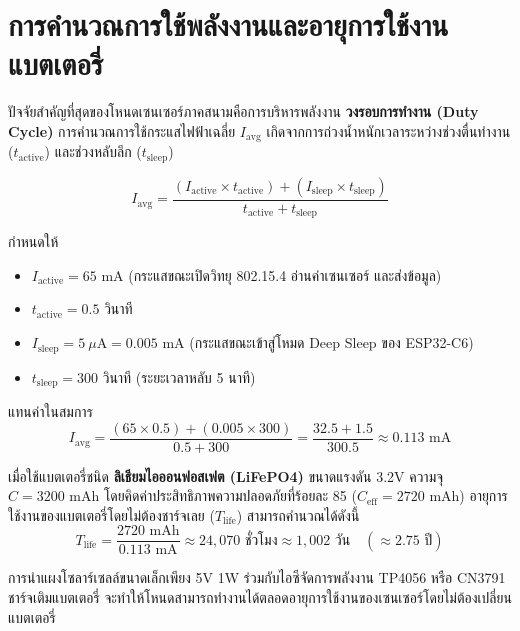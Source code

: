 \section{การคำนวณการใช้พลังงานและอายุการใช้งานแบตเตอรี่}

ปัจจัยสำคัญที่สุดของโหนดเซนเซอร์ภาคสนามคือการบริหารพลังงาน \textbf{วงรอบการทำงาน (Duty Cycle)} การคำนวณการใช้กระแสไฟฟ้าเฉลี่ย $I_{\text{avg}}$ เกิดจากการถ่วงน้ำหนักเวลาระหว่างช่วงตื่นทำงาน ($t_{\text{active}}$) และช่วงหลับลึก ($t_{\text{sleep}}$)

\begin{equation}
    I_{\text{avg}} = \frac{(I_{\text{active}} \times t_{\text{active}}) + (I_{\text{sleep}} \times t_{\text{sleep}})}{t_{\text{active}} + t_{\text{sleep}}}
\end{equation}

กำหนดให้
\begin{itemize}
    \item $I_{\text{active}} = 65\text{ mA}$ (กระแสขณะเปิดวิทยุ 802.15.4 อ่านค่าเซนเซอร์ และส่งข้อมูล)
    \item $t_{\text{active}} = 0.5\text{ วินาที}$
    \item $I_{\text{sleep}} = 5\ \mu\text{A} = 0.005\text{ mA}$ (กระแสขณะเข้าสู่โหมด Deep Sleep ของ ESP32-C6)
    \item $t_{\text{sleep}} = 300\text{ วินาที}$ (ระยะเวลาหลับ 5 นาที)
\end{itemize}

แทนค่าในสมการ
\begin{equation}
    I_{\text{avg}} = \frac{(65 \times 0.5) + (0.005 \times 300)}{0.5 + 300} = \frac{32.5 + 1.5}{300.5} \approx 0.113\text{ mA}
\end{equation}

เมื่อใช้แบตเตอรี่ชนิด \textbf{ลิเธียมไอออนฟอสเฟต (LiFePO4)} ขนาดแรงดัน 3.2V ความจุ $C = 3200\text{ mAh}$ โดยคิดค่าประสิทธิภาพความปลอดภัยที่ร้อยละ 85 ($C_{\text{eff}} = 2720\text{ mAh}$) อายุการใช้งานของแบตเตอรี่โดยไม่ต้องชาร์จเลย ($T_{\text{life}}$) สามารถคำนวณได้ดังนี้
\begin{equation}
    T_{\text{life}} = \frac{2720\text{ mAh}}{0.113\text{ mA}} \approx 24,070\text{ ชั่วโมง} \approx 1,002\text{ วัน} \quad (\approx 2.75\text{ ปี})
\end{equation}

การนำแผงโซลาร์เซลล์ขนาดเล็กเพียง 5V 1W ร่วมกับไอซีจัดการพลังงาน TP4056 หรือ CN3791 ชาร์จเติมแบตเตอรี่ จะทำให้โหนดสามารถทำงานได้ตลอดอายุการใช้งานของเซนเซอร์โดยไม่ต้องเปลี่ยนแบตเตอรี่

